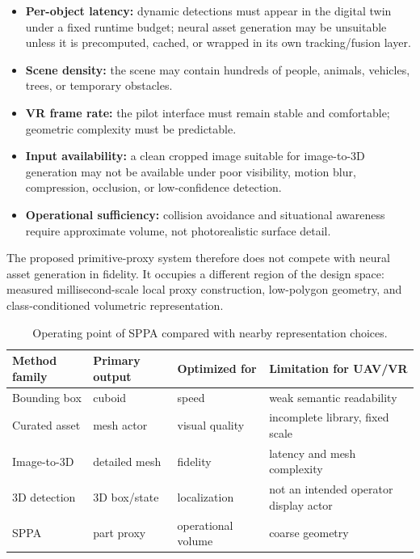 ﻿\documentclass[11pt,a4paper]{article}
\begin{document}
\begin{itemize}
    \item \textbf{Per-object latency:} dynamic detections must appear in the
    digital twin under a fixed runtime budget; neural asset generation may be
    unsuitable unless it is precomputed, cached, or wrapped in its own
    tracking/fusion layer.
    \item \textbf{Scene density:} the scene may contain hundreds of people,
    animals, vehicles, trees, or temporary obstacles.
    \item \textbf{VR frame rate:} the pilot interface must remain stable and
    comfortable; geometric complexity must be predictable.
    \item \textbf{Input availability:} a clean cropped image suitable for
    image-to-3D generation may not be available under poor visibility, motion
    blur, compression, occlusion, or low-confidence detection.
    \item \textbf{Operational sufficiency:} collision avoidance and situational
    awareness require approximate volume, not photorealistic surface detail.
\end{itemize}

The proposed primitive-proxy system therefore does not compete with neural
asset generation in fidelity. It occupies a different region of the design
space: measured millisecond-scale local proxy construction, low-polygon
geometry, and class-conditioned volumetric representation.

\begin{table}[h]
\centering
\caption{Operating point of SPPA compared with nearby representation choices.}
\label{tab:operating-point}
\begin{tabular}{@{}p{2.6cm}p{2.5cm}p{2.6cm}p{5.0cm}@{}}
\toprule
Method family & Primary output & Optimized for & Limitation for UAV/VR \\
\midrule
Bounding box & cuboid & speed & weak semantic readability \\
Curated asset & mesh actor & visual quality & incomplete library, fixed scale \\
Image-to-3D & detailed mesh & fidelity & latency and mesh complexity \\
3D detection & 3D box/state & localization & not an intended operator display actor \\
SPPA & part proxy & operational volume & coarse geometry \\
\bottomrule
\end{tabular}
\end{table}
\end{document}
